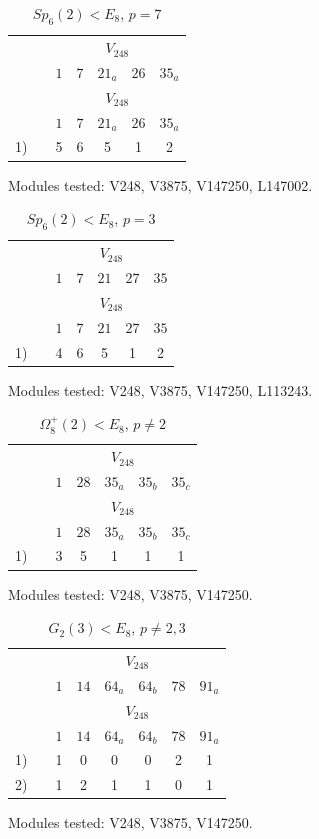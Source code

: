 \setcounter{table}{337}
\begin{longtable}{rc|ccccc}
\caption{$Sp_6(2) < E_8$, $p = 7$}\\
& & \multicolumn{5}{c}{$V_{248}$} \\
& & $1$ & $7$ & $21_{a}$ & $26$ & $35_{a}$ \\ \hline
\endfirsthead
& & \multicolumn{5}{c}{$V_{248}$} \\
& & $1$ & $7$ & $21_{a}$ & $26$ & $35_{a}$ \\ \hline
\endhead
1) &  & 5 & 6 & 5 & 1 & 2 \\
\end{longtable}
\noindent Modules tested: V248, V3875, V147250, L147002.\\

\setcounter{table}{338}
\begin{longtable}{rc|ccccc}
\caption{$Sp_6(2) < E_8$, $p = 3$}\\
& & \multicolumn{5}{c}{$V_{248}$} \\
& & $1$ & $7$ & $21$ & $27$ & $35$ \\ \hline
\endfirsthead
& & \multicolumn{5}{c}{$V_{248}$} \\
& & $1$ & $7$ & $21$ & $27$ & $35$ \\ \hline
\endhead
1) &  & 4 & 6 & 5 & 1 & 2 \\
\end{longtable}
\noindent Modules tested: V248, V3875, V147250, L113243.\\

\setcounter{table}{339}
\begin{longtable}{rc|ccccc}
\caption{$\Omega_8^{+}(2) < E_8$, $p \neq 2$}\\
& & \multicolumn{5}{c}{$V_{248}$} \\
& & $1$ & $28$ & $35_{a}$ & $35_{b}$ & $35_{c}$ \\ \hline
\endfirsthead
& & \multicolumn{5}{c}{$V_{248}$} \\
& & $1$ & $28$ & $35_{a}$ & $35_{b}$ & $35_{c}$ \\ \hline
\endhead
1) &  & 3 & 5 & 1 & 1 & 1 \\
\end{longtable}
\noindent Modules tested: V248, V3875, V147250.\\

\setcounter{table}{340}
\begin{longtable}{rc|cccccc}
\caption{$G_2(3) < E_8$, $p \neq 2, 3$}\\
& & \multicolumn{6}{c}{$V_{248}$} \\
& & $1$ & $14$ & $64_{a}$ & $64_{b}$ & $78$ & $91_{a}$ \\ \hline
\endfirsthead
& & \multicolumn{6}{c}{$V_{248}$} \\
& & $1$ & $14$ & $64_{a}$ & $64_{b}$ & $78$ & $91_{a}$ \\ \hline
\endhead
1) &  & 1 & 0 & 0 & 0 & 2 & 1 \\
2) &  & 1 & 2 & 1 & 1 & 0 & 1 \\
\end{longtable}
\noindent Modules tested: V248, V3875, V147250.\\

